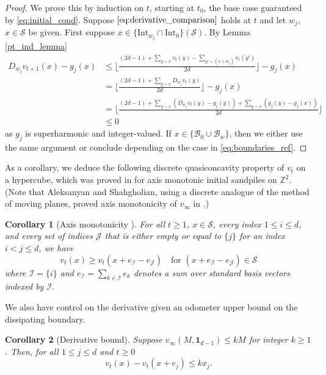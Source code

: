 \documentclass[12pt]{amsart}
\newtheorem{corollary}{Corollary}[section]
\newcommand{\Z}{\mathbb{Z}}
\begin{document}
	\begin{proof}
		We prove this by induction on $t$, starting at $t_0$, the base case guaranteed by \eqref{eq:initial_cond}.
		Suppose $\eqref{eq:derivative_comparison}$ holds at $t$ and let $w_j$, $x \in \mathcal{S}$ be given. 
		First suppose $x \in \{ \mbox{Int}_{w_j} \cap \mbox{Int}_{0} \}(\mathcal{S})$. By Lemma \ref{pt_ind_lemma}
		\begin{align*}
		D_{w_j} v_{t+1}(x) - g_j(x) &\leq \lfloor \frac{(2d -1) + \sum_{y \sim x} v_t(y) - \sum_{y' \sim (x + w_j)} v_t(y')}{2d} \rfloor -  g_j(x) \\
		&=  \lfloor \frac{(2d -1) + \sum_{y \sim x} D_{w_j} v_{t}(y) }{2d} \rfloor -  g_j(x)  \\
		&=  \lfloor \frac{(2d -1) + \sum_{y \sim x} \left( D_{w_j} v_{t}(y) - g_j(y) \right) + \sum_{y \sim x} (g_j(y)-g_j(x))  }{2d} \rfloor  \\
		&\leq  0 
		\end{align*} 
		as $g_j$ is superharmonic and integer-valued.  If $x \in \{ \mathcal{B}_0 \cup \mathcal{B}_{w} \}$, then we either use the same argument or conclude depending on the case in \eqref{eq:boundaries_ref}.
		


	\end{proof}
	
	\noindent As a corollary, we deduce the following discrete quasiconcavity property of $v_t$ on a hypercube, which was proved in \cite{babai2007sandpile}
	for axis monotonic initial sandpiles on $\Z^2$.  (Note that Aleksanyan and Shahgholian, using a discrete analogue of the method of moving planes, proved axis monotonicity
	of $v_{\infty}$ in \cite{aleksanyan2019discrete}.)
	\begin{corollary}[Axis monotonicity \cite{babai2007sandpile}] \label{axis_monotonicity}
		For all $t \geq 1$,
		$x \in \mathcal{S}$,
		every index
		$1 \leq i \leq d$,
		and every set of indices
		$\mathcal{J}$
		that is either empty or equal to $\{ j \}$
		for an index $i < j \leq d$,
		we have
		\[
		v_t(x) \geq v_t(x + e_{\mathcal{I}} - e_{\mathcal{J}}) \quad \mbox{for $(x + e_{\mathcal{I}} - e_{\mathcal{J}}) \in \mathcal{S}$}
		\]
		where $\mathcal{I} = \{ i \}$ and $e_{\mathcal{I}} = \sum_{k \in \mathcal{I}} e_k$ denotes a sum over standard basis vectors indexed by $\mathcal{I}$.
	\end{corollary}

	We also have control on the derivative given an odometer upper bound
	on the dissipating boundary. 
		\begin{corollary}[Derivative bound] \label{cor:derivative_bound}
		Suppose $v_{\infty}(M, \mathbf{1}_{d-1}) \leq k M$ for integer $k \geq 1$. 
		Then, for all $1 \leq j \leq d$ and $t \geq 0$
		\begin{equation} \label{eq:cor:derivative_bound}
		v_t(x) - v_t(x+e_j) \leq k x_j.
		\end{equation}

	\end{corollary}
	
\end{document}
